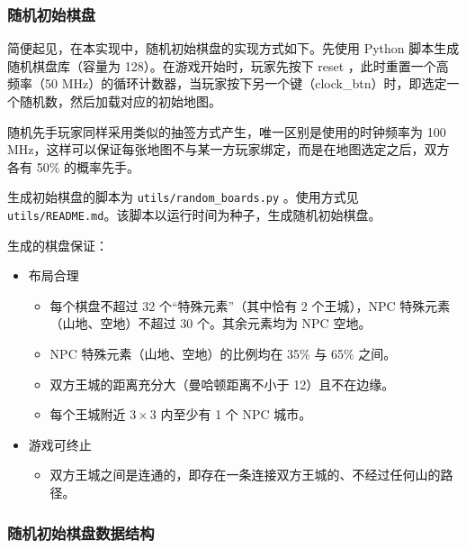 
\subsubsection{随机初始棋盘}
简便起见，在本实现中，随机初始棋盘的实现方式如下。先使用 Python 脚本生成随机棋盘库（容量为 128）。在游戏开始时，玩家先按下 reset ，此时重置一个高频率（50 MHz）的循环计数器，当玩家按下另一个键（clock\_btn）时，即选定一个随机数，然后加载对应的初始地图。

随机先手玩家同样采用类似的抽签方式产生，唯一区别是使用的时钟频率为 100 MHz，这样可以保证每张地图不与某一方玩家绑定，而是在地图选定之后，双方各有 50\% 的概率先手。

生成初始棋盘的脚本为 \texttt{utils/random\_boards.py} 。使用方式见 \texttt{utils/README.md}。该脚本以运行时间为种子，生成随机初始棋盘。

生成的棋盘保证：
\begin{itemize}
    \item 布局合理
        \begin{itemize}
            \item 每个棋盘不超过 32 个“特殊元素”（其中恰有 2 个王城），NPC 特殊元素（山地、空地）不超过 30 个。其余元素均为 NPC 空地。
            \item NPC 特殊元素（山地、空地）的比例均在 35\% 与 65\% 之间。
            \item 双方王城的距离充分大（曼哈顿距离不小于 12）且不在边缘。
            \item 每个王城附近 $3\times 3$ 内至少有 1 个 NPC 城市。
        \end{itemize}
    \item 游戏可终止
        \begin{itemize}
            \item  双方王城之间是连通的，即存在一条连接双方王城的、不经过任何山的路径。
        \end{itemize}
\end{itemize}

\subsubsection{随机初始棋盘数据结构}

